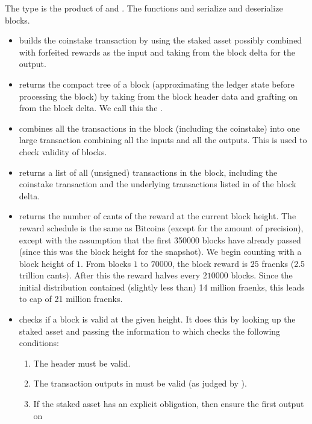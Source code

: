 The type {} is the product of {} and {}.
The functions {} and {} serialize
and deserialize blocks.

\begin{itemize}
\item {} builds the coinstake transaction by
using the staked asset possibly combined with forfeited rewards as the input
and taking {} from the block delta for the output.
\item {} returns the compact tree of a block (approximating the ledger state before
processing the block) by taking {} from the block header data
and grafting on {} from the block delta.
We call this the {}.
\item {} combines all the transactions in the block (including the coinstake) into one large transaction combining all the inputs and all the outputs.
This is used to check validity of blocks.
\item {} returns a list of all (unsigned) transactions in the block,
including the coinstake transaction and the underlying transactions listed in {} of the block delta.
\item {} returns the number of cants of the reward at the current block height.
The reward schedule is the same as Bitcoins (except for the amount of precision), except with the assumption that the first 350000 blocks have already passed (since this was the block height for the snapshot).
We begin counting with a block height of $1$. From blocks $1$ to $70000$,
the block reward is $25$ fraenks (2.5 trillion cants).
After this the reward halves every $210000$ blocks.
Since the initial distribution contained (slightly less than) 14 million fraenks, this leads to cap of 21 million fraenks.
\item {} checks if a block is valid at the given height.
It does this by looking up the staked asset and passing the information to {}
which checks the following conditions:
\begin{enumerate}
\item The header must be valid.
\item The transaction outputs in {} must be valid (as judged by {}).
\item If the staked asset has an explicit obligation, then ensure the first output on {}

\end{enumerate}
\end{itemize}
